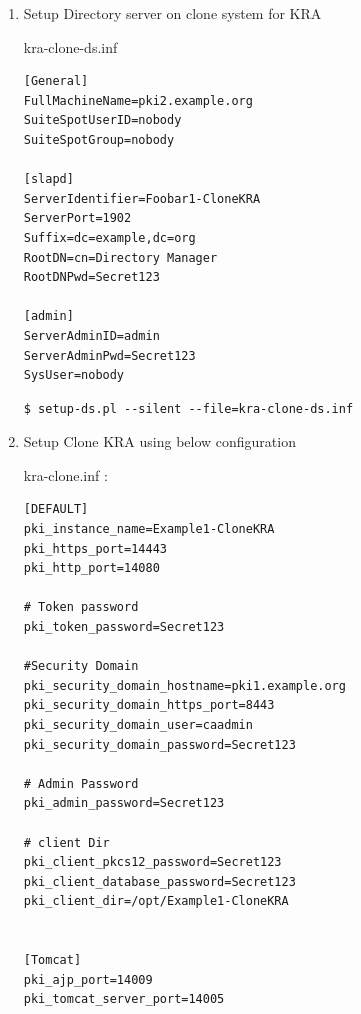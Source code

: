 \documentclass[12pt]{report}
\begin{document}
\begin{enumerate}[label*=\arabic*.]
\begin{enumerate}[label*=\arabic*.]
\begin{enumerate}[label*=\arabic*.]
                        \item Setup Directory server on clone system for KRA

                            kra-clone-ds.inf
                            \begin{lstlisting}[style=configFile]
[General]
FullMachineName=pki2.example.org
SuiteSpotUserID=nobody
SuiteSpotGroup=nobody

[slapd]
ServerIdentifier=Foobar1-CloneKRA
ServerPort=1902
Suffix=dc=example,dc=org
RootDN=cn=Directory Manager
RootDNPwd=Secret123

[admin]
ServerAdminID=admin
ServerAdminPwd=Secret123
SysUser=nobody
                            \end{lstlisting}
                            \begin{lstlisting}[style=bashInputStyle]
$ setup-ds.pl --silent --file=kra-clone-ds.inf
                            \end{lstlisting}
                        \item Setup Clone KRA using below configuration
                            
                            kra-clone.inf :
                            \begin{lstlisting}[style=configFile]
[DEFAULT]
pki_instance_name=Example1-CloneKRA
pki_https_port=14443
pki_http_port=14080

# Token password
pki_token_password=Secret123

#Security Domain
pki_security_domain_hostname=pki1.example.org
pki_security_domain_https_port=8443
pki_security_domain_user=caadmin
pki_security_domain_password=Secret123

# Admin Password
pki_admin_password=Secret123

# client Dir
pki_client_pkcs12_password=Secret123
pki_client_database_password=Secret123
pki_client_dir=/opt/Example1-CloneKRA


[Tomcat]
pki_ajp_port=14009
pki_tomcat_server_port=14005


\end{lstlisting}
\end{enumerate}
\end{enumerate}
\end{enumerate}
\end{document}
